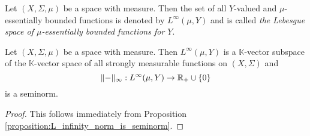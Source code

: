 \begin{definition}
Let $(X,\Sigma,\mu)$ be a space with measure. Then the set of all $Y$-valued and $\mu$-essentially bounded functions is denoted by $L^{\infty}(\mu,Y)$ and is called \textit{the Lebesgue space of $\mu$-essentially bounded functions for $Y$}.
\end{definition}

\begin{corollary}\label{corollary:L_infinity_is_seminormed_topological_vector_space}
Let $(X,\Sigma,\mu)$ be a space with measure. Then $L^{\infty}(\mu,Y)$ is a $\mathbb{K}$-vector subspace of the $\mathbb{K}$-vector space of all strongly measurable functions on $(X,\Sigma)$ and 
$$\lVert -\rVert_{\infty}:L^{\infty}(\mu,Y)\rightarrow {\mathbb R}_+\cup \{0\}$$
is a seminorm.
\end{corollary}
\begin{proof}
This follows immediately from Proposition \ref{proposition:L_infinity_norm_is_seminorm}.
\end{proof}

